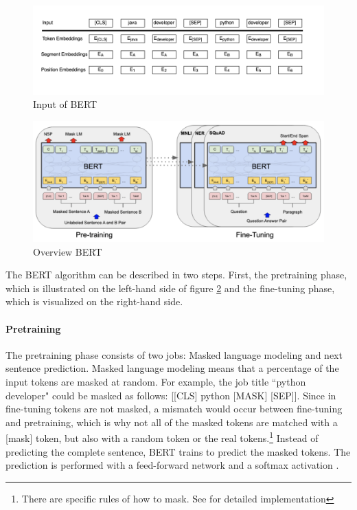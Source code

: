 \documentclass[12pt, a4paper, titlepage]{article}
\begin{document}
\begin{figure}[hb!]
  \center
  \includegraphics[scale=0.8]{BERTInput_own.png}
  \caption[Input of BERT]{\label{fig: F4} Input of BERT \citep[5]{devlin2018}}
\end{figure}

\begin{figure}[hb!]
  \center
  \includegraphics[scale=0.5]{BERTOverview.png}
  \caption[Overview BERT]{\label{fig: F3} Overview BERT \citep[3]{devlin2018}}
\end{figure}


The \ac{BERT} algorithm can be described in two steps. First, the pretraining phase, which is illustrated on the left-hand side of figure \ref{fig: F3} and the fine-tuning phase, which is visualized on the right-hand side. 

\paragraph{Pretraining}
The pretraining phase consists of two jobs: Masked language modeling and next sentence prediction. Masked language modeling means that a percentage of the input tokens are masked at random. For example, the job title ``python developer" could be masked as follows: [[CLS] python [MASK] [SEP]]. Since in fine-tuning tokens are not masked, a mismatch would occur between fine-tuning and pretraining, which is why not all of the masked tokens are matched with a [mask] token, but also with a random token or the real tokens.\footnote{There are specific rules of how to mask. See \citet{devlin2018} for detailed implementation} Instead of predicting the complete sentence, \ac{BERT} trains to predict the masked tokens. The prediction is performed with a feed-forward network and a softmax activation \citep{devlin2018,ravichandiran2021}. 
\end{document}

